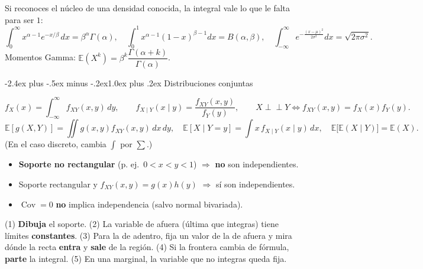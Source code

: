 \documentclass[10pt,a4paper]{article}
\makeatletter
\newcommand{\E}{\mathbb{E}}
\newcommand{\Cov}{\operatorname{Cov}}
\newcommand{\ind}{\perp\!\!\!\perp}
\renewcommand\section{\@startsection{section}{1}{0pt}%
  {-2.4ex plus -.5ex minus -.2ex}{1.0ex plus .2ex}%
  {\normalfont\large\bfseries\color{seccolor}}}
\makeatother
\begin{document}
\begin{notebox}[frametitle={El truco del núcleo}]
Si reconoces el núcleo de una densidad conocida, la integral vale lo que le
falta para ser $1$:
\[
\int_0^\infty x^{\alpha-1}e^{-x/\beta}\,dx=\beta^\alpha\Gamma(\alpha),\quad
\int_0^1 x^{\alpha-1}(1-x)^{\beta-1}dx=B(\alpha,\beta),\quad
\int_{-\infty}^{\infty}e^{-\frac{(x-\mu)^2}{2\sigma^2}}dx=\sqrt{2\pi\sigma^2}.
\]
Momentos Gamma: $\E(X^k)=\beta^k\dfrac{\Gamma(\alpha+k)}{\Gamma(\alpha)}$.
\end{notebox}

\section{Distribuciones conjuntas}

\begin{defbox}[frametitle={Marginal, condicional e independencia}]
\[
f_X(x)=\int_{-\infty}^{\infty}f_{XY}(x,y)\,dy,\qquad
f_{X\mid Y}(x\mid y)=\frac{f_{XY}(x,y)}{f_Y(y)},\qquad
X\ind Y\iff f_{XY}(x,y)=f_X(x)f_Y(y).
\]
\[
\E[g(X,Y)]=\iint g(x,y)f_{XY}(x,y)\,dx\,dy,\quad
\E[X\mid Y=y]=\int x\,f_{X\mid Y}(x\mid y)\,dx,\quad
\E\big[\E(X\mid Y)\big]=\E(X).
\]
(En el caso discreto, cambia $\int$ por $\sum$.)
\end{defbox}

\begin{warnbox}[frametitle={Independencia: atajos}]
\begin{itemize}
  \item \textbf{Soporte no rectangular} (p. ej.\ $0<x<y<1$) $\Rightarrow$
        \textbf{no} son independientes.
  \item Soporte rectangular y $f_{XY}(x,y)=g(x)h(y)$ $\Rightarrow$ sí son
        independientes.
  \item $\Cov=0$ \textbf{no} implica independencia (salvo normal bivariada).
\end{itemize}
\end{warnbox}

\begin{notebox}[frametitle={Límites de integración (lee el soporte)}]
(1) \textbf{Dibuja} el soporte. (2) La variable de afuera (última que integras)
tiene límites \textbf{constantes}. (3) Para la de adentro, fija un valor de la de
afuera y mira dónde la recta \textbf{entra} y \textbf{sale} de la región.
(4) Si la frontera cambia de fórmula, \textbf{parte} la integral. (5) En una
marginal, la variable que no integras queda fija.
\end{notebox}
\end{document}
